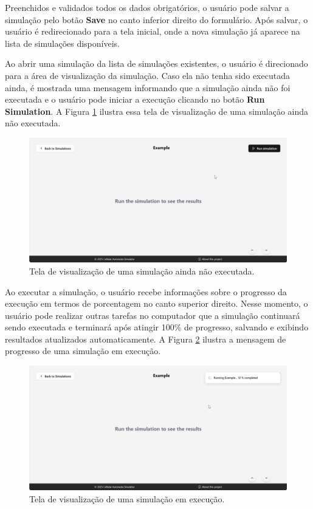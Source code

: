 \documentclass[12pt,oneside]{report}
\begin{document}
Preenchidos e validados todos os dados obrigatórios, o usuário pode salvar a simulação pelo botão \textbf{Save} no canto inferior direito do formulário. Após salvar, o usuário é redirecionado para a tela inicial, onde a nova simulação já aparece na lista de simulações disponíveis.

Ao abrir uma simulação da lista de simulações existentes, o usuário é direcionado para a área de visualização da simulação. Caso ela não tenha sido executada ainda, é mostrada uma mensagem informando que a simulação ainda não foi executada e o usuário pode iniciar a execução clicando no botão \textbf{Run Simulation}. A Figura \ref{fig:interface_simulacao} ilustra essa tela de visualização de uma simulação ainda não executada.

\begin{figure}[H]
    \centering
    \includegraphics[width=1\textwidth]{img/empty_simulacao.png}
    \caption{\small Tela de visualização de uma simulação ainda não executada.}
    \label{fig:interface_simulacao}
\end{figure}

Ao executar a simulação, o usuário recebe informações sobre o progresso da execução em termos de porcentagem no canto superior direito. Nesse momento, o usuário pode realizar outras tarefas no computador que a simulação continuará sendo executada e terminará após atingir 100\% de progresso, salvando e exibindo resultados atualizados automaticamente. A Figura \ref{fig:interface_simulacao_executando} ilustra a mensagem de progresso de uma simulação em execução.

\begin{figure}[H]
    \centering
    \includegraphics[width=1\textwidth]{img/running_simulacao.png}
    \caption{\small Tela de visualização de uma simulação em execução.}
    \label{fig:interface_simulacao_executando}
\end{figure}
\end{document}
